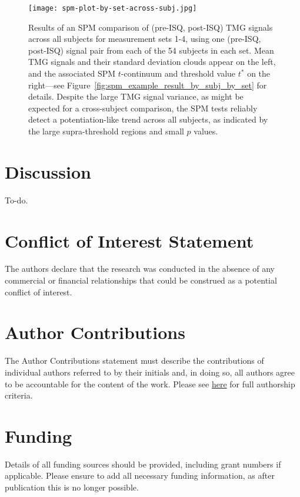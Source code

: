 \documentclass[utf8]{FrontiersinHarvard}
\begin{document}
\begin{figure}
	\centering
    \texttt{[image: spm-plot-by-set-across-subj.jpg]}
    \caption{Results of an SPM comparison of (pre-ISQ, post-ISQ) TMG signals across all subjects for measurement sets 1-4, using one (pre-ISQ, post-ISQ) signal pair from each of the 54 subjects in each set.
    Mean TMG signals and their standard deviation clouds appear on the left, and the associated SPM $ t $-continuum and threshold value $ t^{*} $ on the right---see Figure~\ref{fig:spm_example_result_by_subj_by_set} for details.
    Despite the large TMG signal variance, as might be expected for a cross-subject comparison, the SPM tests reliably detect a potentiation-like trend across all subjects, as indicated by the large supra-threshold regions and small $ p $ values.}

    \label{fig:spm_example_across_subj_by_set}
\end{figure}

\section{Discussion}
To-do.

\section*{Conflict of Interest Statement}
The authors declare that the research was conducted in the absence of any commercial or financial relationships that could be construed as a potential conflict of interest.

\section*{Author Contributions}
The Author Contributions statement must describe the contributions of individual authors referred to by their initials and, in doing so, all authors agree to be accountable for the content of the work.
Please see \href{https://www.frontiersin.org/about/policies-and-publication-ethics#AuthorshipAuthorResponsibilities}{here} for full authorship criteria.

\section*{Funding}
Details of all funding sources should be provided, including grant numbers if applicable.
Please ensure to add all necessary funding information, as after publication this is no longer possible.
\end{document}
